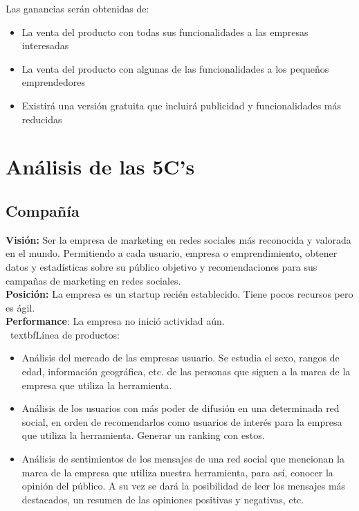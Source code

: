 \documentclass[oneside]{book}
\begin{document}
Las ganancias ser\'{a}n obtenidas de:
\begin{itemize}
\item La venta del producto con todas sus funcionalidades a las empresas interesadas
\item La venta del producto con algunas de las funcionalidades a los peque\~{n}os emprendedores
\item Existir\'{a} una versión gratuita que incluir\'{a} publicidad y funcionalidades más reducidas
\end{itemize}


\newpage

\section{Análisis de las 5C’s}


\subsection{Compa\~{n}\'{i}a}

	\textbf{Visi\'{o}n:} Ser la empresa de marketing en redes sociales m\'{a}s reconocida y valorada en el mundo. Permitiendo a cada usuario, empresa o emprendimiento, obtener datos y estadísticas sobre su p\'{u}blico objetivo y recomendaciones para sus campa\~{n}as de marketing en redes sociales.\\

	\textbf{Posición:} La empresa es un startup recién establecido. Tiene pocos recursos pero es \'{a}gil.\\

	\textbf{Performance}: La empresa no inici\'{o} actividad a\'{u}n. \\

\	textbf{Línea de productos:}

	\begin{itemize}
		\item An\'{a}lisis del mercado de las empresas usuario. Se estudia el sexo, rangos de edad, información geográfica, etc. de las personas que siguen a la marca de la empresa que utiliza la herramienta. 
		
		\item Análisis de los usuarios con m\'{a}s poder de difusi\'{o}n en una determinada red social, en orden de recomendarlos como usuarios de inter\'{e}s para la empresa que utiliza la herramienta. Generar un ranking con estos.
		
		\item An\'{a}lisis de sentimientos de los mensajes de una red social que mencionan la marca de la empresa que utiliza nuestra herramienta, para as\'{i}, conocer la opini\'{o}n del p\'{u}blico. A su vez se dar\'{a} la posibilidad de leer los mensajes más destacados, un resumen de las opiniones positivas y negativas, etc.
	\end{itemize}
\end{document}
